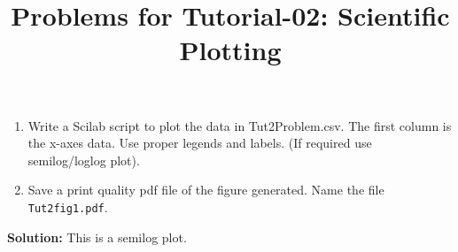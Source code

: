 \documentclass[10pt,a4paper]{article}
\begin{document}
\title{Problems for Tutorial-02: Scientific Plotting}
\date{}
\maketitle
\begin{enumerate}
\item Write a Scilab script to plot the data in Tut2Problem.csv. 
The first column is the x-axes data. Use proper legends and labels.
(If required use semilog/loglog plot).
\item Save a print quality pdf file of the figure generated. Name the 
file \verb'Tut2fig1.pdf'.
\end{enumerate}
{\bf Solution:} This is a semilog plot.
\begin{figure}[ht!]
\end{figure}
\end{document}
